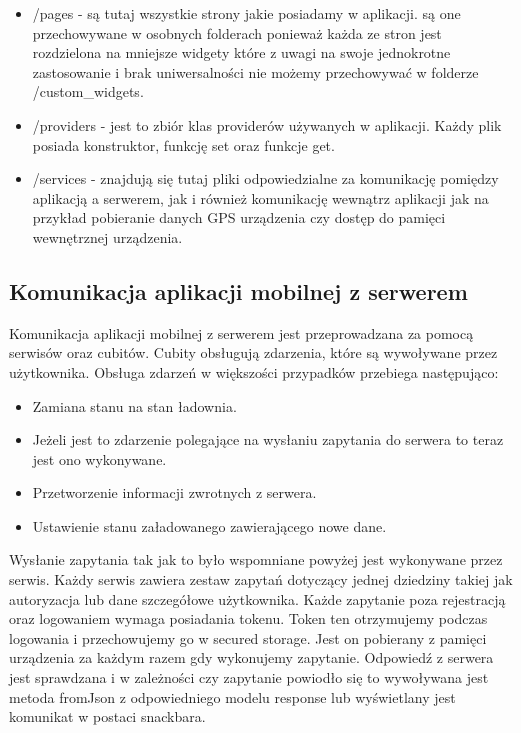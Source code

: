 \documentclass[a4paper,twoside,12pt]{book}
\begin{document}
\begin{itemize}
    \item /pages - są tutaj wszystkie strony jakie posiadamy w aplikacji. są one przechowywane w osobnych folderach ponieważ każda ze stron jest rozdzielona na mniejsze widgety które z uwagi na swoje jednokrotne zastosowanie i brak uniwersalności nie możemy przechowywać w folderze /custom\_widgets. 

    \item /providers - jest to zbiór klas providerów używanych w aplikacji. Każdy plik posiada konstruktor, funkcję set oraz funkcje get.

    \item /services - znajdują się tutaj pliki odpowiedzialne za komunikację pomiędzy aplikacją a serwerem, jak i również komunikację wewnątrz aplikacji jak na przykład pobieranie danych GPS urządzenia czy dostęp do pamięci wewnętrznej urządzenia. 

\end{itemize}

\subsection{Komunikacja aplikacji mobilnej z serwerem}
Komunikacja aplikacji mobilnej z serwerem jest przeprowadzana za pomocą serwisów oraz cubitów. Cubity obsługują zdarzenia, które są wywoływane przez użytkownika. Obsługa zdarzeń w większości przypadków przebiega następująco:
\begin{itemize}
    \item Zamiana stanu na stan ładownia.
    \item Jeżeli jest to zdarzenie polegające na wysłaniu zapytania do serwera to teraz jest ono wykonywane.
    \item Przetworzenie informacji zwrotnych z serwera.
    \item Ustawienie stanu załadowanego zawierającego nowe dane.
\end{itemize}

Wysłanie zapytania tak jak to było wspomniane powyżej jest wykonywane przez serwis. Każdy serwis zawiera zestaw zapytań dotyczący jednej dziedziny takiej jak autoryzacja lub dane szczegółowe użytkownika. Każde zapytanie poza rejestracją oraz logowaniem wymaga posiadania tokenu. Token ten otrzymujemy podczas logowania i przechowujemy go w secured storage. Jest on pobierany z pamięci urządzenia za każdym razem gdy wykonujemy zapytanie. Odpowiedź z serwera jest sprawdzana i w zależności czy zapytanie powiodło się to wywoływana jest metoda fromJson z odpowiedniego modelu response lub wyświetlany jest komunikat w postaci snackbara.
\end{document}
